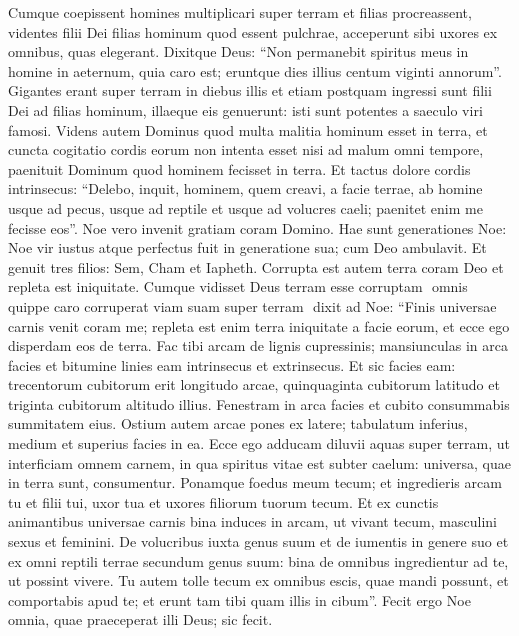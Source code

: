\begin{biblechapter}
\begin{biblechapter}
\begin{biblechapter}
\begin{biblechapter}
\begin{biblechapter}
\begin{biblechapter}
\verse Cumque coepissent homines multiplicari super terram et filias procreassent, 
\verse videntes filii Dei filias hominum quod essent pulchrae, acceperunt sibi uxores ex omnibus, quas elegerant. 
\verse Dixitque Deus: “Non permanebit spiritus meus in homine in aeternum, quia caro est; eruntque dies illius centum viginti annorum”. 
\verse Gigantes erant super terram in diebus illis et etiam postquam ingressi sunt filii Dei ad filias hominum, illaeque eis genuerunt: isti sunt potentes a saeculo viri famosi.
 \verse Videns autem Dominus quod multa malitia hominum esset in terra, et cuncta cogitatio cordis eorum non intenta esset nisi ad malum omni tempore, 
\verse paenituit Dominum quod hominem fecisset in terra. Et tactus dolore cordis intrinsecus: 
\verse “Delebo, inquit, hominem, quem creavi, a facie terrae, ab homine usque ad pecus, usque ad reptile et usque ad volucres caeli; paenitet enim me fecisse eos”.
 \verse Noe vero invenit gratiam coram Domino.
 \verse Hae sunt generationes Noe: Noe vir iustus atque perfectus fuit in generatione sua; cum Deo ambulavit. 
\verse Et genuit tres filios: Sem, Cham et Iapheth.
 \verse Corrupta est autem terra coram Deo et repleta est iniquitate. 
\verse Cumque vidisset Deus terram esse corruptam ­ omnis quippe caro corruperat viam suam super terram ­ 
\verse dixit ad Noe: “Finis universae carnis venit coram me; repleta est enim terra iniquitate a facie eorum, et ecce ego disperdam eos de terra.
 \verse Fac tibi arcam de lignis cupressinis; mansiunculas in arca facies et bitumine linies eam intrinsecus et extrinsecus. 
\verse Et sic facies eam: trecentorum cubitorum erit longitudo arcae, quinquaginta cubitorum latitudo et triginta cubitorum altitudo illius. 
\verse Fenestram in arca facies et cubito consummabis summitatem eius. Ostium autem arcae pones ex latere; tabulatum inferius, medium et superius facies in ea.
 \verse Ecce ego adducam diluvii aquas super terram, ut interficiam omnem carnem, in qua spiritus vitae est subter caelum: universa, quae in terra sunt, consumentur. 
\verse Ponamque foedus meum tecum; et ingredieris arcam tu et filii tui, uxor tua et uxores filiorum tuorum tecum. 
\verse Et ex cunctis animantibus universae carnis bina induces in arcam, ut vivant tecum, masculini sexus et feminini. 
 \verse De volucribus iuxta genus suum et de iumentis in genere suo et ex omni reptili terrae secundum genus suum: bina de omnibus ingredientur ad te, ut possint vivere. 
\verse Tu autem tolle tecum ex omnibus escis, quae mandi possunt, et comportabis apud te; et erunt tam tibi quam illis in cibum”.
 \verse Fecit ergo Noe omnia, quae praeceperat illi Deus; sic fecit.
 

\end{biblechapter}
\end{biblechapter}
\end{biblechapter}
\end{biblechapter}
\end{biblechapter}
\end{biblechapter}

